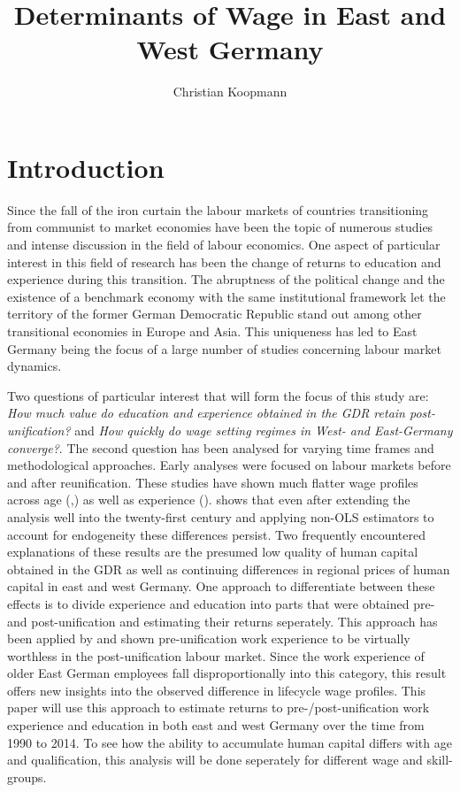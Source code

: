 \documentclass{article}
\begin{document}
\title{Determinants of Wage in East and West Germany}
\author{Christian Koopmann}
\maketitle


\section{Introduction}
Since the fall of the iron curtain the labour markets of countries transitioning from communist to market economies have been the topic of numerous studies and intense discussion in the field of labour economics. One aspect of particular interest in this field of research has been the change of returns to education and experience during this transition. The abruptness of the political change and the existence of a benchmark economy with the same institutional framework let the territory of the former German Democratic Republic stand out among other transitional economies in Europe and Asia. This uniqueness has led to East Germany being the focus of a large number of studies concerning labour market dynamics. 

Two questions of particular interest that will form the focus of this study are: 
\textit{How much value do education and experience obtained in the GDR retain post-unification?} and \textit{How quickly do wage setting regimes in West- and East-Germany converge?}.
The second question has been analysed for varying time frames and methodological approaches. Early analyses were focused on labour markets before and after reunification. These studies have shown much flatter wage profiles across age  (\cite{krueger_comparative_1992},\cite{burda_getting_1997}) as well as experience (\cite{jurajda_when_2007}). \cite{orlowski_east_2009} shows that even after extending the analysis well into the twenty-first century and applying non-OLS estimators to account for endogeneity these differences persist. Two frequently encountered explanations of these results are the presumed low quality of human capital obtained in the GDR as well as continuing differences in regional prices of human capital in east and west Germany. One approach to differentiate between these effects is to divide experience and education into parts that were obtained pre- and post-unification and estimating their returns seperately. This approach has been applied by \cite{gathmann_understanding_2004} and shown pre-unification work experience to be virtually worthless in the post-unification labour market. Since the work experience of older East German employees fall disproportionally into this category, this result offers new insights into the observed difference in lifecycle wage profiles. This paper will use this approach to estimate returns to pre-/post-unification work experience and education in both east and west Germany over the time from 1990 to 2014. To see how the ability to accumulate human capital differs with age and qualification, this analysis will be done seperately for different wage and skill-groups.
\end{document}

